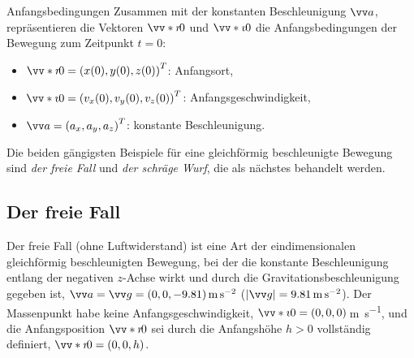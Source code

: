 \begin{rememberbox}{Anfangsbedingungen}
    Zusammen mit der konstanten Beschleunigung $\ivec{a}$, repräsentieren die Vektoren $\ivecS{r}{0}$ und $\ivecS{v}{0}$ die Anfangsbedingungen der Bewegung zum Zeitpunkt $t=0$:
    \begin{itemize}[itemsep=1.5pt]
        \item $\ivecS{r}{0} = {(x(0),y(0),z(0))}^\T$: Anfangsort,
        \item $\ivecS{v}{0} = {(v_{x}(0),v_{y}(0),v_{z}(0))}^\T$: Anfangsgeschwindigkeit,
        \item $\ivec{a} = {(a_{x},a_{y},a_{z})}^\T$: konstante Beschleunigung.
    \end{itemize}
\end{rememberbox}
Die beiden gängigsten Beispiele für eine gleichförmig beschleunigte Bewegung sind \textit{der freie Fall} und \textit{der schräge Wurf}, die als nächstes behandelt werden. 

\subsection{Der freie Fall}\label{subsec: freier_Fall}
Der freie Fall (ohne Luftwiderstand) ist eine Art der eindimensionalen gleichförmig beschleunigten Bewegung, bei der die konstante Beschleunigung entlang der negativen $z$-Achse wirkt und durch die Gravitationsbeschleunigung gegeben ist, $\ivec{a} = \ivec{g} = \inlrowThree{0}{0}{-9.81}\,\si{\meter\per\second\squared}$ ($|\ivec{g}| = \SI{9.81}{\meter\per\second\squared}$). Der Massenpunkt habe keine Anfangsgeschwindigkeit, $\ivecS{v}{0} = \inlrowThree{0}{0}{0}$\,\si{\meter\per\second}, und die Anfangsposition $\ivecS{r}{0}$ sei durch die Anfangshöhe $h > 0$ vollständig definiert, $\ivecS{r}{0} = \inlrowThree{0}{0}{h}$. 

